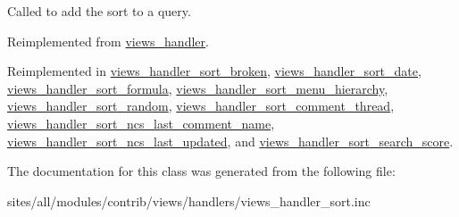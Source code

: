 Called to add the sort to a query. 

Reimplemented from \hyperlink{classviews__handler_91e22c95696d9fdb9ed753a10d42a21d}{views\_\-handler}.

Reimplemented in \hyperlink{classviews__handler__sort__broken_6298719637ac590b81496b4487b573ea}{views\_\-handler\_\-sort\_\-broken}, \hyperlink{classviews__handler__sort__date_3d3680d96fee82a746bac50c051016a8}{views\_\-handler\_\-sort\_\-date}, \hyperlink{classviews__handler__sort__formula_208dff453ab94f55000e8027ed3c8588}{views\_\-handler\_\-sort\_\-formula}, \hyperlink{classviews__handler__sort__menu__hierarchy_04fd6337ac7ec486789586b65cf545fd}{views\_\-handler\_\-sort\_\-menu\_\-hierarchy}, \hyperlink{classviews__handler__sort__random_eaf6fcc03c9d1a0f86a77b9e5314229a}{views\_\-handler\_\-sort\_\-random}, \hyperlink{classviews__handler__sort__comment__thread_6ea2c9fdba530fd022c1eafd5b0c4cea}{views\_\-handler\_\-sort\_\-comment\_\-thread}, \hyperlink{classviews__handler__sort__ncs__last__comment__name_23a0eb15347f118155df094a2cadd249}{views\_\-handler\_\-sort\_\-ncs\_\-last\_\-comment\_\-name}, \hyperlink{classviews__handler__sort__ncs__last__updated_05d2ef9eb8727ee81915b34254d99355}{views\_\-handler\_\-sort\_\-ncs\_\-last\_\-updated}, and \hyperlink{classviews__handler__sort__search__score_7d144db57e043dc594021228f8567726}{views\_\-handler\_\-sort\_\-search\_\-score}.

The documentation for this class was generated from the following file:\begin{CompactItemize}
\item 
sites/all/modules/contrib/views/handlers/views\_\-handler\_\-sort.inc\end{CompactItemize}
